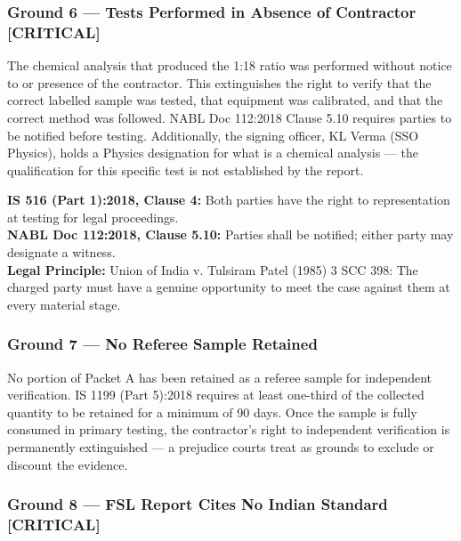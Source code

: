 \documentclass[12pt, a4paper]{article}
\begin{document}
\subsubsection{Ground 6 --- Tests Performed in Absence of Contractor \textbf{[CRITICAL]}}

\begin{groundbox}
The chemical analysis that produced the 1:18 ratio was performed without notice to or presence of the contractor. This extinguishes the right to verify that the correct labelled sample was tested, that equipment was calibrated, and that the correct method was followed. NABL Doc 112:2018 Clause 5.10 requires parties to be notified before testing. Additionally, the signing officer, KL Verma (SSO Physics), holds a Physics designation for what is a chemical analysis --- the qualification for this specific test is not established by the report.
\end{groundbox}

\begin{standardbox}
\textbf{IS 516 (Part 1):2018, Clause 4:} Both parties have the right to representation at testing for legal proceedings.\\
\textbf{NABL Doc 112:2018, Clause 5.10:} Parties shall be notified; either party may designate a witness.\\
\textbf{Legal Principle:} Union of India v. Tulsiram Patel (1985) 3 SCC 398: The charged party must have a genuine opportunity to meet the case against them at every material stage.
\end{standardbox}

\subsubsection{Ground 7 --- No Referee Sample Retained}

No portion of Packet A has been retained as a referee sample for independent verification. IS 1199 (Part 5):2018 requires at least one-third of the collected quantity to be retained for a minimum of 90 days. Once the sample is fully consumed in primary testing, the contractor's right to independent verification is permanently extinguished --- a prejudice courts treat as grounds to exclude or discount the evidence.

\subsubsection{Ground 8 --- FSL Report Cites No Indian Standard \textbf{[CRITICAL]}}
\end{document}
